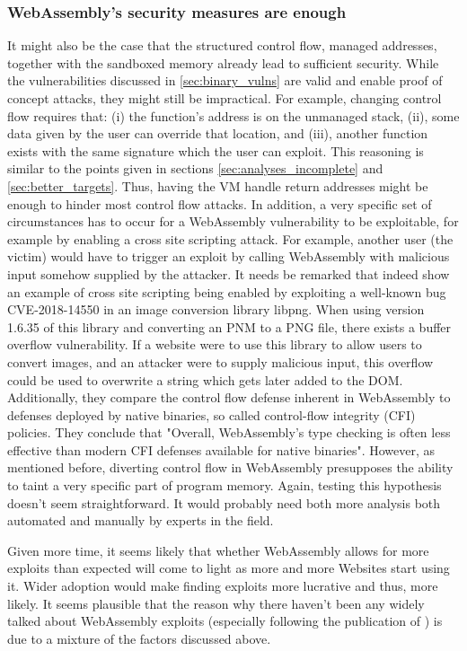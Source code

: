 \documentclass[sigconf]{acmart}
\begin{document}
{\subsubsection{WebAssembly's security measures are enough}
\label{sec:wasm_sec_strong}
It might also be the case that the structured control flow, managed addresses, together with the sandboxed memory already lead to sufficient security. While the vulnerabilities discussed in \ref{sec:binary_vulns} are valid and enable proof of concept attacks, they might still be impractical. For example, changing control flow requires that: (i) the function's address is on the unmanaged stack, (ii), some data given by the user can override that location, and (iii), another function exists with the same signature which the user can exploit. This reasoning is similar to the points given in sections \ref{sec:analyses_incomplete} and \ref{sec:better_targets}. Thus, having the VM handle return addresses might be enough to hinder most control flow attacks. In addition, a very specific set of circumstances has to occur for a WebAssembly vulnerability to be exploitable, for example by enabling a cross site scripting attack. For example, another user (the victim) would have to trigger an exploit by calling WebAssembly with malicious input somehow supplied by the attacker. It needs be remarked that \cite{lehmann_everything_2020} indeed show an example of cross site scripting being enabled by exploiting a well-known bug CVE-2018-14550 in an image conversion library libpng. When using version 1.6.35 of this library and converting an PNM to a PNG file, there exists a buffer overflow vulnerability. If a website were to use this library to allow users to convert images, and an attacker were to supply malicious input, this overflow could be used to overwrite a string which gets later added to the DOM. Additionally, they compare the control flow defense inherent in WebAssembly to defenses deployed by native binaries, so called control-flow integrity (CFI) policies. They conclude that "Overall, WebAssembly’s type checking is often less effective than modern CFI defenses available for native binaries". However, as mentioned before, diverting control flow in WebAssembly presupposes the ability to taint a very specific part of program memory. Again, testing this hypothesis doesn't seem straightforward. It would probably need both more analysis both automated and manually by experts in the field.

Given more time, it seems likely that whether WebAssembly allows for more exploits than expected will come to light as more and more Websites start using it. Wider adoption would make finding exploits more lucrative and thus, more likely. It seems plausible that the reason why there haven't been any widely talked about WebAssembly exploits (especially following the publication of \cite{lehmann_everything_2020}) is due to a mixture of the factors discussed above.

}
\end{document}
